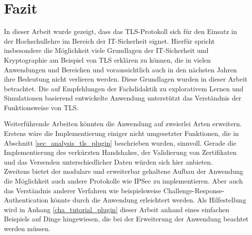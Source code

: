 \chapter{Fazit}


In dieser Arbeit wurde gezeigt, dass das TLS-Protokoll sich für den Einsatz in der Hochschullehre im Bereich der IT-Sicherheit eignet. Hierfür spricht insbesondere die Möglichkeit viele Grundlagen der IT-Sicherheit und Kryptographie am Beispiel von TLS erklären zu können, die in vielen Anwendungen und Bereichen und voraussichtlich auch in den nächsten Jahren ihre Bedeutung nicht verlieren werden. Diese Grundlagen wurden in dieser Arbeit betrachtet. 
Die auf Empfehlungen der Fachdidaktik zu explorativem Lernen und Simulationen basierend entwickelte Anwendung unterstützt das Verständnis der Funktionsweise von TLS. 


Weiterführende Arbeiten könnten die Anwendung auf zweierlei Arten erweitern. Erstens wäre die Implementierung einiger nicht umgesetzter Funktionen, die in Abschnitt \ref{sec_analysis_tls_plugin} beschrieben wurden, sinnvoll. Gerade die Implementierung des verkürzten Handshakes, der Validierung von Zertifikaten und das Versenden unterschiedlicher Daten würden sich hier anbieten.\\
Zweitens bietet der modulare und erweiterbar gehaltene Aufbau der Anwendung die Möglichkeit auch andere Protokolle wie IPSec zu implementieren. Aber auch das Verständnis anderer Verfahren wie beispielsweise Challenge-Response-Authentication könnte durch die Anwendung erleichtert werden. Als Hilfestellung wird in Anhang \ref{cha_tutorial_plugin} dieser Arbeit anhand eines einfachen Beispiels auf Dinge hingewiesen, die bei der Erweiterung der Anwendung beachtet werden müssen.